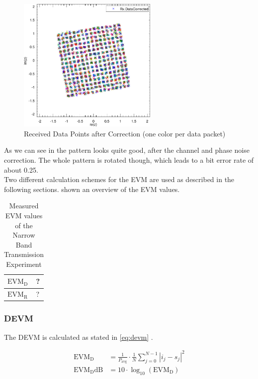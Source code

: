 \begin{figure}[p]
  \centering
  \includegraphics[width=0.6\textwidth]{figures/matlab/res_450_cp_corrected}
  \caption{Received Data Points after Correction (one color per data packet)}
  \label{fig:res_450_cp_corrected}
\end{figure}

As we can see in  the pattern looks quite good,
after the channel and phase noise correction.
The whole pattern is rotated though, which leads to a bit error rate of
about 0.25. \\

Two different calculation schemes for the \acrfull{EVM} are used as described in
the following sections.  shown an overview of the
\gls{EVM} values.

\begin{table}[h]
  \centering
  \begin{tabular}{|l|l|}
    \hline
    $\text{EVM}_\text{D}$                           & ? \\ \hline
    $\text{EVM}_\text{R}$                           & ? \\ \hline
  \end{tabular}
  \caption{Measured \gls{EVM} values of the Narrow Band Transmission Experiment}
  \label{tab:res_450_evm}
\end{table}

\subsubsection{\acrfull{DEVM}}
The \gls{DEVM} is calculated as stated in \eqref{eq:devm} \cite{razavi2011rf}.

\begin{align}
  \text{EVM}_\text{D} &= \frac{1}{P_{\text{avg}}} \cdot \frac{1}{N}
  \sum_{j=0}^{N-1} |i_j - s_j|^2
  \label{eq:devm} \\
  \text{EVM}_\text{D}\text{dB} &= 10 \cdot \log_{10} (\text{EVM}_\text{D})
\end{align}

